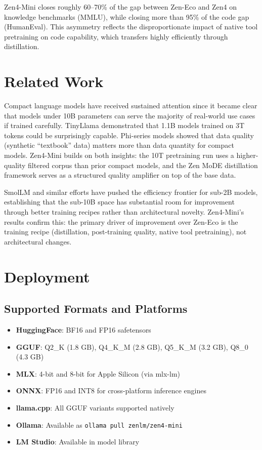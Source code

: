 \documentclass[11pt,a4paper]{article}
\begin{document}
Zen4-Mini closes roughly 60--70\% of the gap between Zen-Eco and Zen4 on knowledge
benchmarks (MMLU), while closing more than 95\% of the code gap (HumanEval). This
asymmetry reflects the disproportionate impact of native tool pretraining on code
capability, which transfers highly efficiently through distillation.

\section{Related Work}

Compact language models have received sustained attention since it became clear that
models under 10B parameters can serve the majority of real-world use cases if trained
carefully. TinyLlama \cite{zhang2024tinyllama} demonstrated that 1.1B models trained on
3T tokens could be surprisingly capable. Phi-series models \cite{gunasekar2023textbooks}
showed that data quality (synthetic ``textbook'' data) matters more than data quantity
for compact models. Zen4-Mini builds on both insights: the 10T pretraining run uses
a higher-quality filtered corpus than prior compact models, and the Zen MoDE distillation
framework serves as a structured quality amplifier on top of the base data.

SmolLM \cite{allal2024smollm} and similar efforts have pushed the efficiency frontier
for sub-2B models, establishing that the sub-10B space has substantial room for
improvement through better training recipes rather than architectural novelty.
Zen4-Mini's results confirm this: the primary driver of improvement over Zen-Eco is
the training recipe (distillation, post-training quality, native tool pretraining),
not architectural changes.

\section{Deployment}

\subsection{Supported Formats and Platforms}

\begin{itemize}
    \item \textbf{HuggingFace}: BF16 and FP16 safetensors
    \item \textbf{GGUF}: Q2\_K (1.8 GB), Q4\_K\_M (2.8 GB), Q5\_K\_M (3.2 GB), Q8\_0 (4.3 GB)
    \item \textbf{MLX}: 4-bit and 8-bit for Apple Silicon (via mlx-lm)
    \item \textbf{ONNX}: FP16 and INT8 for cross-platform inference engines
    \item \textbf{llama.cpp}: All GGUF variants supported natively
    \item \textbf{Ollama}: Available as \texttt{ollama pull zenlm/zen4-mini}
    \item \textbf{LM Studio}: Available in model library
\end{itemize}
\end{document}
